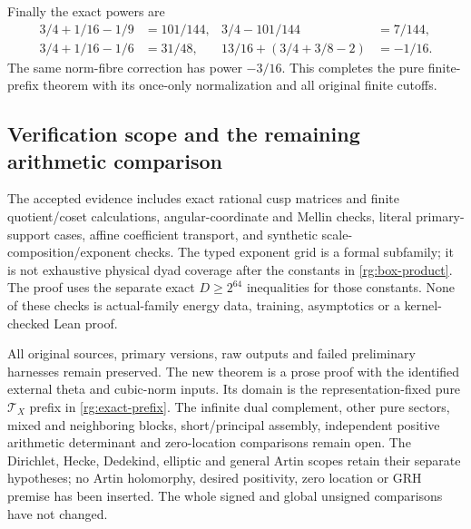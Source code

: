 Finally the exact powers are
\begin{equation}\label{rg:all-powers}
 \begin{aligned}
 3/4+1/16-1/9&=101/144,&3/4-101/144&=7/144,\\
 3/4+1/16-1/6&=31/48,&
 13/16+(3/4+3/8-2)&=-1/16 .
 \end{aligned}
\end{equation}
The same norm-fibre correction has power \(-3/16\).
This completes the pure finite-prefix theorem with its once-only
normalization and all original finite cutoffs.

\subsection{Verification scope and the remaining arithmetic comparison}
\label{rg:evidence}
The accepted evidence includes exact rational cusp matrices and
finite quotient/coset calculations, angular-coordinate and Mellin
checks, literal primary-support cases, affine coefficient transport,
and synthetic scale-composition/exponent checks.
The typed exponent grid is a formal subfamily; it is not exhaustive
physical dyad coverage after the constants in
\eqref{rg:box-product}. The proof uses the separate exact
\(D\ge2^{64}\) inequalities for those constants.
None of these checks is actual-family energy data, training,
asymptotics or a kernel-checked Lean proof.

All original sources, primary versions, raw outputs and failed
preliminary harnesses remain preserved. The new theorem is a
prose proof with the identified external theta and cubic-norm
inputs. Its domain is the representation-fixed pure
\(\mathcal T_X\) prefix in \eqref{rg:exact-prefix}.
The infinite dual complement, other pure sectors, mixed and
neighboring blocks, short/principal assembly, independent positive
arithmetic determinant and zero-location comparisons remain open.
The Dirichlet, Hecke, Dedekind, elliptic and general Artin scopes
retain their separate hypotheses; no Artin holomorphy, desired
positivity, zero location or GRH premise has been inserted.
The whole signed and global unsigned comparisons have not changed.
